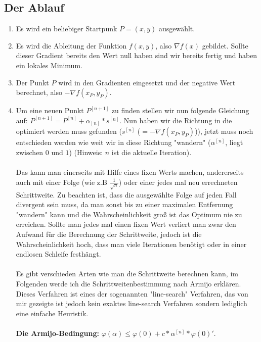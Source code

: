 \documentclass[a4paper, 11pt]{article}
\begin{document}
\subsection{Der Ablauf}

\begin{enumerate}
      \item 
      Es wird ein beliebiger Startpunk $P=(x,y)$ ausgewählt.
      \item 
      Es wird die Ableitung der Funktion $f(x,y)$, also ${\nabla}f(x)$ gebildet. Sollte dieser Gradient bereits den Wert null haben sind wir bereits fertig und haben ein lokales Minimum.
      \item 
      Der Punkt $P$ wird in den Gradienten eingesetzt und der negative Wert berechnet, also $-{\nabla}f(x_{P},y_{P})$.
      \item
      Um eine neuen Punkt $P^{[n+1]}$ zu finden stellen wir nun folgende Gleichung auf: $P^{[n+1]} = P^{[n]} + \alpha_{[n]} * s^{[n]}$. Nun haben wir die Richtung in die optimiert werden muss gefunden ($s^{[n]}$ ($=-{\nabla}f(x_{P},y_{P})$)), jetzt muss noch entschieden werden wie weit wir in diese Richtung "wandern" ($\alpha^{[n]}$, liegt zwischen $0$ und $1$) (Hinweis: $n$ ist die aktuelle Iteration). \\\\
      Das kann man einerseits mit Hilfe eines fixen Werts machen, andererseits auch mit einer Folge (wie z.B $\frac{1}{\sqrt{n}}$) oder einer jedes mal neu errechneten Schrittweite. Zu beachten ist, dass die ausgewählte Folge auf jeden Fall divergent sein muss, da man sonst bis zu einer maximalen Entfernung "wandern" kann und die Wahrscheinlichkeit groß ist das Optimum nie zu erreichen. Sollte man jedes mal einen fixen Wert verliert man zwar den Aufwand für die Berechnung der  Schrittweite, jedoch ist die Wahrscheinlichkeit hoch, dass man viele Iterationen benötigt oder in einer endlosen Schleife festhängt. \\\\
      Es gibt verschieden Arten wie man die Schrittweite berechnen kann, im Folgenden werde ich die Schrittweitenbestimmung nach Armijo erklären. Dieses Verfahren ist eines der sogenannten "line-search" Verfahren, das von mir gezeigte ist jedoch kein exaktes line-search Verfahren sondern lediglich eine einfache Heuristik. \\\\
      \textbf{Die Armijo-Bedingung:} $\varphi(\alpha) \leq \varphi(0) + c * \alpha^{[n]} * \varphi(0)'$. \\\\

\end{enumerate}
\end{document}
